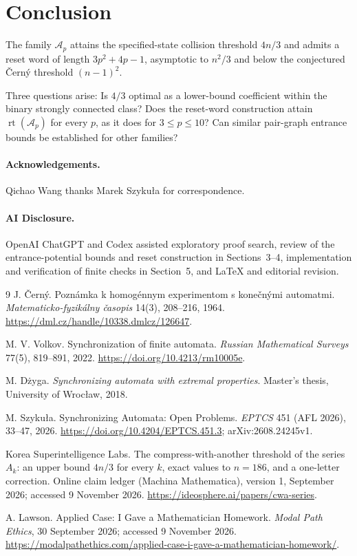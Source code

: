 \documentclass[11pt]{article}
\begin{document}
\section{Conclusion}
The family $\mathcal A_p$ attains the specified-state collision threshold $4n/3$ and admits a reset word of length $3p^2+4p-1$, asymptotic to $n^2/3$ and below the conjectured \v Cern\'y threshold $(n-1)^2$.

Three questions arise: Is $4/3$ optimal as a lower-bound coefficient within the binary strongly connected class? Does the reset-word construction attain $\operatorname{rt}(\mathcal A_p)$ for every $p$, as it does for $3\leq p\leq10$? Can similar pair-graph entrance bounds be established for other families?

\paragraph{Acknowledgements.}
Qichao Wang thanks Marek Szyku\l a for correspondence.

\paragraph{AI Disclosure.}
OpenAI ChatGPT and Codex assisted exploratory proof search, review of the entrance-potential bounds and reset construction in Sections~3--4, implementation and verification of finite checks in Section~5, and LaTeX and editorial revision.

\begin{thebibliography}{9}
 J. \v Cern\'y.
Pozn\'amka k homog\'ennym experimentom s kone\v cn\'ymi automatmi.
\emph{Matematicko-fyzik\'alny \v casopis} 14(3), 208--216, 1964.
\url{https://dml.cz/handle/10338.dmlcz/126647}.

 M. V. Volkov.
Synchronization of finite automata.
\emph{Russian Mathematical Surveys} 77(5), 819--891, 2022.
\url{https://doi.org/10.4213/rm10005e}.

 M. D\.{z}yga.
\emph{Synchronizing automata with extremal properties}.
Master's thesis, University of Wroc\l aw, 2018.

 M. Szyku\l a.
Synchronizing Automata: Open Problems.
\emph{EPTCS} 451 (AFL 2026), 33--47, 2026.
\url{https://doi.org/10.4204/EPTCS.451.3}; arXiv:2608.24245v1.

 Korea Superintelligence Labs.
The compress-with-another threshold of the series $A_k$: an upper bound $4n/3$ for every $k$, exact values to $n=186$, and a one-letter correction.
Online claim ledger (Machina Mathematica), version 1, September 2026; accessed 9 November 2026.
\url{https://ideosphere.ai/papers/cwa-series}.

 A. Lawson.
Applied Case: I Gave a Mathematician Homework.
\emph{Modal Path Ethics}, 30 September 2026; accessed 9 November 2026.
\url{https://modalpathethics.com/applied-case-i-gave-a-mathematician-homework/}.
\end{thebibliography}
\end{document}

